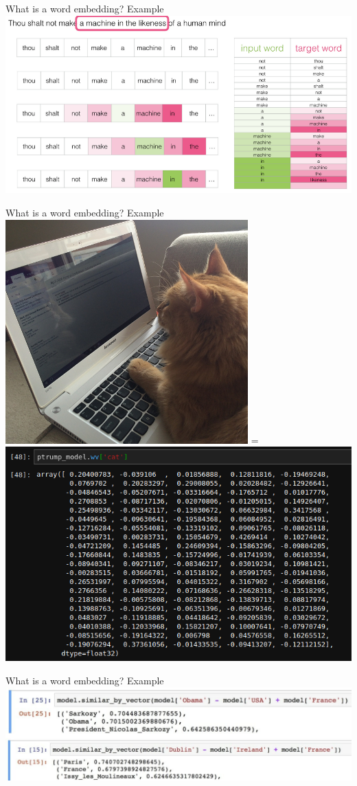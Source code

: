 \documentclass[10pt]{beamer}
\begin{document}
\begin{frame}{What is a word embedding? Example}
        \centering
        \includegraphics[width=1\textwidth]{embeddings_explained.png}
        \cite{word2vec}
\end{frame}

\begin{frame}{What is a word embedding? Example}
    \includegraphics[width=.475\textwidth]{popkins.jpg}
    =
    \includegraphics[width=.475\textwidth]{cat}
\end{frame}

\begin{frame}{What is a word embedding? Example}
  \includegraphics[width=1\textwidth]{vectormath1.jpg}
  \cite{word2vec}
\end{frame}
\end{document}

